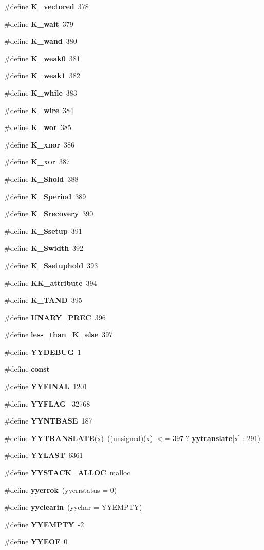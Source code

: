 \begin{CompactItemize}
\item 
\#define {\bf K\_\-vectored}\ 378
\item 
\#define {\bf K\_\-wait}\ 379
\item 
\#define {\bf K\_\-wand}\ 380
\item 
\#define {\bf K\_\-weak0}\ 381
\item 
\#define {\bf K\_\-weak1}\ 382
\item 
\#define {\bf K\_\-while}\ 383
\item 
\#define {\bf K\_\-wire}\ 384
\item 
\#define {\bf K\_\-wor}\ 385
\item 
\#define {\bf K\_\-xnor}\ 386
\item 
\#define {\bf K\_\-xor}\ 387
\item 
\#define {\bf K\_\-Shold}\ 388
\item 
\#define {\bf K\_\-Speriod}\ 389
\item 
\#define {\bf K\_\-Srecovery}\ 390
\item 
\#define {\bf K\_\-Ssetup}\ 391
\item 
\#define {\bf K\_\-Swidth}\ 392
\item 
\#define {\bf K\_\-Ssetuphold}\ 393
\item 
\#define {\bf KK\_\-attribute}\ 394
\item 
\#define {\bf K\_\-TAND}\ 395
\item 
\#define {\bf UNARY\_\-PREC}\ 396
\item 
\#define {\bf less\_\-than\_\-K\_\-else}\ 397
\item 
\#define {\bf YYDEBUG}\ 1
\item 
\#define {\bf const}
\item 
\#define {\bf YYFINAL}\ 1201
\item 
\#define {\bf YYFLAG}\ -32768
\item 
\#define {\bf YYNTBASE}\ 187
\item 
\#define {\bf YYTRANSLATE}(x)\ ((unsigned)(x) $<$= 397 ? {\bf yytranslate}[x] : 291)
\item 
\#define {\bf YYLAST}\ 6361
\item 
\#define {\bf YYSTACK\_\-ALLOC}\ malloc
\item 
\#define {\bf yyerrok}\ (yyerrstatus = 0)
\item 
\#define {\bf yyclearin}\ (yychar = YYEMPTY)
\item 
\#define {\bf YYEMPTY}\ -2
\item 
\#define {\bf YYEOF}\ 0
\item 

\end{CompactItemize}
